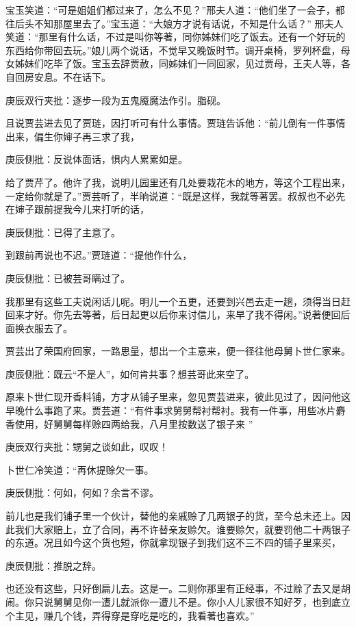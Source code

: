 \begin{parag}
    宝玉笑道：“可是姐姐们都过来了，怎么不见？”邢夫人道：“他们坐了一会子，都往后头不知那屋里去了。”宝玉道：“大娘方才说有话说，不知是什么话？” 邢夫人笑道：“那里有什么话，不过是叫你等著，同你姊妹们吃了饭去。还有一个好玩的东西给你带回去玩。”娘儿两个说话，不觉早又晚饭时节。调开桌椅，罗列杯盘，母女姊妹们吃毕了饭。宝玉去辞贾赦，同姊妹们一同回家，见过贾母，王夫人等，各自回房安息。不在话下。\begin{note}庚辰双行夹批：逐步一段为五鬼魇魔法作引。脂砚。\end{note}
\end{parag}


\begin{parag}
    且说贾芸进去见了贾琏，因打听可有什么事情。贾琏告诉他：“前儿倒有一件事情出来，偏生你婶子再三求了我，\begin{note}庚辰侧批：反说体面话，惧内人累累如是。\end{note}给了贾芹了。他许了我，说明儿园里还有几处要栽花木的地方，等这个工程出来，一定给你就是了。”贾芸听了，半晌说道：“既是这样，我就等著罢。叔叔也不必先在婶子跟前提我今儿来打听的话，\begin{note}庚辰侧批：已得了主意了。\end{note}到跟前再说也不迟。”贾琏道：“提他作什么，\begin{note}庚辰侧批：已被芸哥瞒过了。\end{note}我那里有这些工夫说闲话儿呢。明儿一个五更，还要到兴邑去走一趟，须得当日赶回来才好。你先去等著，后日起更以后你来讨信儿，来早了我不得闲。”说著便回后面换衣服去了。
\end{parag}


\begin{parag}
    贾芸出了荣国府回家，一路思量，想出一个主意来，便一径往他母舅卜世仁家来。\begin{note}庚辰侧批：既云“不是人”，如何肯共事？想芸哥此来空了。\end{note}原来卜世仁现开香料铺，方才从铺子里来，忽见贾芸进来，彼此见过了，因问他这早晚什么事跑了来。贾芸道：“有件事求舅舅帮衬帮衬。我有一件事，用些冰片麝香使用，好舅舅每样赊四两给我，八月里按数送了银子来 ”\begin{note}庚辰双行夹批：甥舅之谈如此，叹叹！\end{note}卜世仁冷笑道：“再休提赊欠一事。\begin{note}庚辰侧批：何如，何如？余言不谬。\end{note}前儿也是我们铺子里一个伙计，替他的亲戚赊了几两银子的货，至今总未还上。因此我们大家赔上，立了合同，再不许替亲友赊欠。谁要赊欠，就要罚他二十两银子的东道。况且如今这个货也短，你就拿现银子到我们这不三不四的铺子里来买，\begin{note}庚辰侧批：推脱之辞。\end{note}也还没有这些，只好倒扁儿去。这是一。二则你那里有正经事，不过赊了去又是胡闹。你只说舅舅见你一遭儿就派你一遭儿不是。你小人儿家很不知好歹，也到底立个主见，赚几个钱，弄得穿是穿吃是吃的，我看著也喜欢。”
\end{parag}


